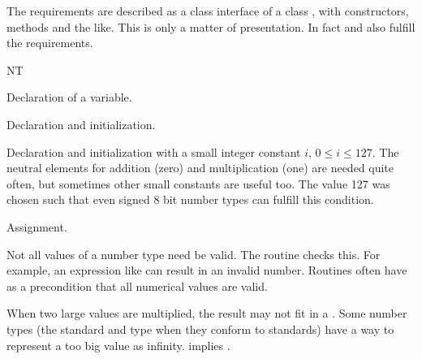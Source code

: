 The requirements are described as a class interface of a class , 
with constructors, methods and the like. 
This is only a matter of presentation.  
In fact  and  also fulfill the requirements.

\begin{ccClass} {NT}
\ccSetTwoColumns{}{\hspace*{8.5cm}}
\ccCreation
{}

	    {Declaration of a variable.}


	    {Declaration and initialization.}


	    {Declaration and initialization with a small integer
constant $i$, $0 \leq i \leq 127$. The neutral elements for addition
(zero) and multiplication (one) are needed quite often, but sometimes
other small constants are useful too. The value 127 was chosen such
that even signed 8 bit number types can fulfill this condition.  }

\ccOperations
{}
        {Assignment.  }


{Not all values of a number type need be valid. The routine
 checks this. For example, an expression like
 can result in an invalid number. Routines often
have as a precondition that all numerical values are valid.}

{ When two large values are multiplied, the result may not fit in a
  . 
  Some number types (the standard  and  type
  when they conform to standards) have a way to represent a too big
  value as infinity.   implies .}

       {}
\ccGlue
{}
       {}
\ccGlue
{}
       {}
\ccGlue
{}
       {}
\ccGlue
{}
       {}
\ccGlue
{}
       {}
\ccGlue
{}
       {}
\ccGlue
{}
       {}
\ccGlue
{}
       {}
\ccGlue
{}
       {}
\ccGlue
{}
       {}
\ccGlue
{}
       {}
\ccGlue
{}
       {}


\end{ccClass}
